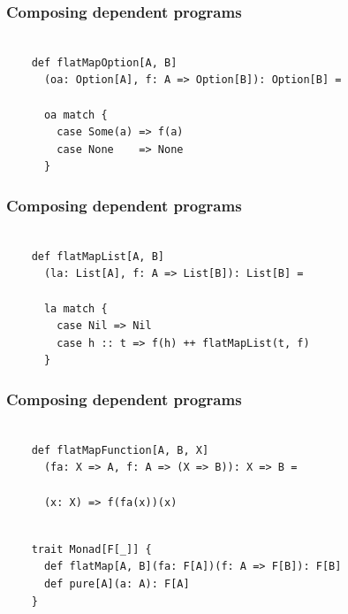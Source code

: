 \documentclass{beamer}
\begin{document}
\begin{frame}[fragile]

  \frametitle{Composing dependent programs}

  \begin{verbatim}

    def flatMapOption[A, B]
      (oa: Option[A], f: A => Option[B]): Option[B] =

      oa match {
        case Some(a) => f(a)
        case None    => None
      }

  \end{verbatim}

\end{frame}

\begin{frame}[fragile]

  \frametitle{Composing dependent programs}

  \begin{verbatim}

    def flatMapList[A, B]
      (la: List[A], f: A => List[B]): List[B] =

      la match {
        case Nil => Nil
        case h :: t => f(h) ++ flatMapList(t, f)
      }

  \end{verbatim}

\end{frame}

\begin{frame}[fragile]

  \frametitle{Composing dependent programs}

  \begin{verbatim}

    def flatMapFunction[A, B, X]
      (fa: X => A, f: A => (X => B)): X => B =

      (x: X) => f(fa(x))(x)

  \end{verbatim}

\end{frame}

\begin{frame}[fragile]

  \begin{verbatim}

    trait Monad[F[_]] {
      def flatMap[A, B](fa: F[A])(f: A => F[B]): F[B]
      def pure[A](a: A): F[A]
    }

  \end{verbatim}

\end{frame}
\end{document}
